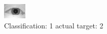 \begin{figure}[h!]
\begin{center}
\includegraphics[width=0.60\columnwidth]{figures/ID893_class_1_target_2.png}
\end{center}
\caption{ Classification: 1 actual target: 2}
\label{fig:ID893_class_1_target_2}
\end{figure}
